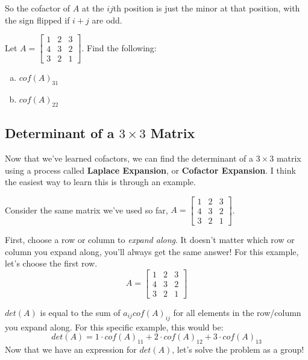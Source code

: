 \documentclass[11pt]{exam}
\begin{document}
    So the cofactor of $A$ at the $ij$th position is just the minor at that position, with the sign flipped if $i + j$ are odd.

    \begin{questions}
        \item Let $A = \begin{bmatrix} 1 & 2 & 3 \\ 4 & 3 & 2 \\ 3 & 2 & 1 \end{bmatrix}$. Find the following:
        \begin{enumerate}[a.]
            \item $cof(A)_{31}$
            \item $cof(A)_{22}$
        \end{enumerate}
    \end{questions}

    \vspace{20px}
    \subsection{Determinant of a $3 \times 3$ Matrix}
    Now that we've learned cofactors, we can find the determinant of a $3 \times 3$ matrix using a process called \textbf{Laplace Expansion}, or
    \textbf{Cofactor Expansion}. I think the easiest way to learn this is through an example.

    Consider the same matrix we've used so far, $A = \begin{bmatrix} 1 & 2 & 3 \\ 4 & 3 & 2 \\ 3 & 2 & 1 \end{bmatrix}$.

    First, choose a row or column to \textit{expand along}. It doesn't matter which row or column you expand along, you'll always get the same answer!
    For this example, let's choose the first row.
    $$A = \begin{bmatrix} \boxed{1} & \boxed{2} & \boxed{3} \\ 4 & 3 & 2 \\ 3 & 2 & 1 \end{bmatrix}$$

    $det(A)$ is equal to the sum of $a_{ij} cof(A)_{ij}$ for all elements in the row/column you expand along. For this specific example,
    this would be:
    $$det(A) = 1 \cdot cof(A)_{11} + 2 \cdot cof(A)_{12} + 3 \cdot cof(A)_{13}$$
    Now that we have an expression for $det(A)$, let's solve the problem as a group!
\end{document}
